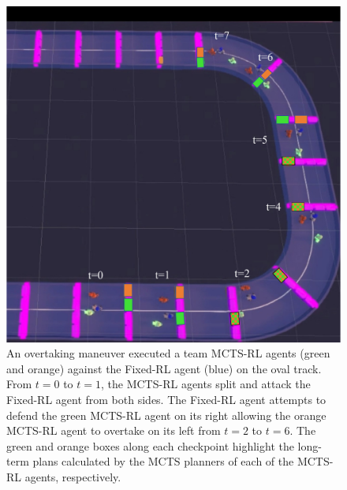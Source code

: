  \begin{figure}
  \centering
  \includegraphics[height=0.7\textheight]{Figures/MCTSRLTeamOvertake.pdf}
  \caption [Overtaking maneuver by team of MCTS-RL agents.] {An overtaking maneuver executed a team MCTS-RL agents (green and orange) against the Fixed-RL agent (blue) on the oval track. From $t=0$ to $t=1$, the MCTS-RL agents split and attack the Fixed-RL agent from both sides. The Fixed-RL agent attempts to defend the green MCTS-RL agent on its right allowing the orange MCTS-RL agent to overtake on its left from $t=2$ to $t=6$. The green and orange boxes along each checkpoint highlight the long-term plans calculated by the MCTS planners of each of the MCTS-RL agents, respectively.}
  \label{fig:team_mctsrl:overtake}
\end{figure}


